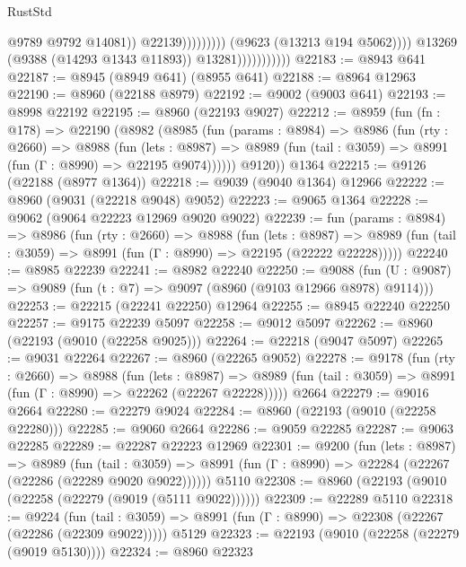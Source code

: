 \begin{lexlean}{RustStd}
\begin{coremodule}
                                                    @9789
                                                    @9792
                                                    @14081))
                                                @22139)))))))))
                              (@9623 (@13213 @194 @5062))))
                          @13269
                          (@9388 (@14293 @1343 @11893))
                          @13281)))))))))))
@22183 := @8943 @641
@22187 := @8945 (@8949 @641) (@8955 @641)
@22188 := @8964 @12963
@22190 := @8960 (@22188 @8979)
@22192 := @9002 (@9003 @641)
@22193 := @8998 @22192
@22195 := @8960 (@22193 @9027)
@22212 := @8959
    (fun (fn : @178) =>
    @22190
      (@8982
        (@8985
          (fun (params : @8984) =>
          @8986
            (fun (rty : @2660) =>
            @8988
              (fun (lets : @8987) =>
              @8989 (fun (tail : @3059) => @8991 (fun (Γ : @8990) => @22195 @9074))))))
        @9120))
    @1364
@22215 := @9126 (@22188 (@8977 @1364))
@22218 := @9039 (@9040 @1364) @12966
@22222 := @8960 (@9031 (@22218 @9048) @9052)
@22223 := @9065 @1364
@22228 := @9062 (@9064 @22223 @12969 @9020 @9022)
@22239 := fun (params : @8984) =>
  @8986
    (fun (rty : @2660) =>
    @8988
      (fun (lets : @8987) =>
      @8989 (fun (tail : @3059) => @8991 (fun (Γ : @8990) => @22195 (@22222 @22228)))))
@22240 := @8985 @22239
@22241 := @8982 @22240
@22250 := @9088
    (fun (U : @9087) => @9089 (fun (t : @7) => @9097 (@8960 (@9103 @12966 @8978) @9114)))
@22253 := @22215 (@22241 @22250) @12964
@22255 := @8945 @22240 @22250
@22257 := @9175 @22239 @5097
@22258 := @9012 @5097
@22262 := @8960 (@22193 (@9010 (@22258 @9025)))
@22264 := @22218 (@9047 @5097)
@22265 := @9031 @22264
@22267 := @8960 (@22265 @9052)
@22278 := @9178
    (fun (rty : @2660) =>
    @8988
      (fun (lets : @8987) =>
      @8989 (fun (tail : @3059) => @8991 (fun (Γ : @8990) => @22262 (@22267 @22228)))))
    @2664
@22279 := @9016 @2664
@22280 := @22279 @9024
@22284 := @8960 (@22193 (@9010 (@22258 @22280)))
@22285 := @9060 @2664
@22286 := @9059 @22285
@22287 := @9063 @22285
@22289 := @22287 @22223 @12969
@22301 := @9200
    (fun (lets : @8987) =>
    @8989
      (fun (tail : @3059) =>
      @8991 (fun (Γ : @8990) => @22284 (@22267 (@22286 (@22289 @9020 @9022))))))
    @5110
@22308 := @8960 (@22193 (@9010 (@22258 (@22279 (@9019 (@5111 @9022))))))
@22309 := @22289 @5110
@22318 := @9224
    (fun (tail : @3059) => @8991 (fun (Γ : @8990) => @22308 (@22267 (@22286 (@22309 @9022)))))
    @5129
@22323 := @22193 (@9010 (@22258 (@22279 (@9019 @5130))))
@22324 := @8960 @22323

\end{coremodule}
\end{lexlean}
